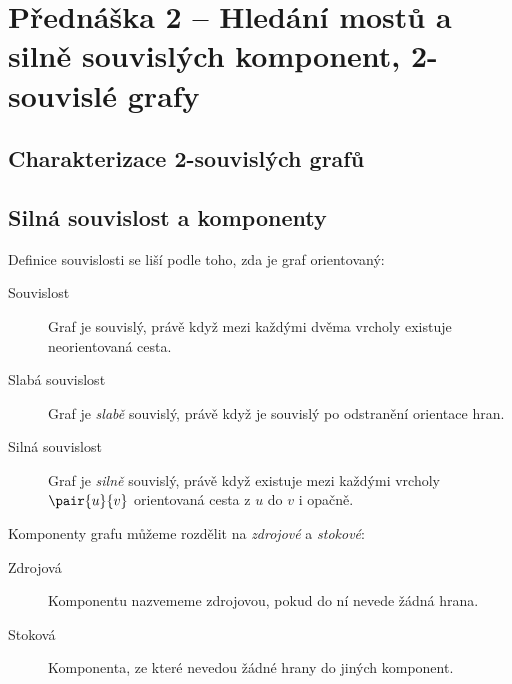 \section{Přednáška 2 -- Hledání mostů a silně souvislých komponent, 2-souvislé grafy}

\subsection{Charakterizace 2-souvislých grafů}



\subsection{Silná souvislost a komponenty}

Definice souvislosti se liší podle toho, zda je graf orientovaný:

\begin{description}
    \item[Souvislost] Graf je souvislý, právě když mezi každými dvěma vrcholy existuje neorientovaná cesta.
    \item[Slabá souvislost] Graf je \textit{slabě} souvislý, právě když je souvislý po odstranění orientace hran.
    \item[Silná souvislost] Graf je \textit{silně} souvislý, právě když existuje mezi každými vrcholy $\pair{u}{v}$ orientovaná cesta z $u$ do $v$ i opačně.
\end{description}



Komponenty grafu můžeme rozdělit na \textit{zdrojové} a \textit{stokové}:

\begin{description}
    \item[Zdrojová] Komponentu nazvememe zdrojovou, pokud do ní nevede žádná hrana.
    \item[Stoková] Komponenta, ze které nevedou žádné hrany do jiných komponent.
\end{description}

